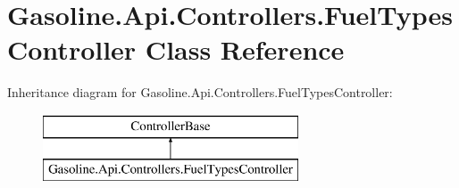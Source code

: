 \hypertarget{class_gasoline_1_1_api_1_1_controllers_1_1_fuel_types_controller}{}\section{Gasoline.\+Api.\+Controllers.\+Fuel\+Types\+Controller Class Reference}
\label{class_gasoline_1_1_api_1_1_controllers_1_1_fuel_types_controller}
Inheritance diagram for Gasoline.\+Api.\+Controllers.\+Fuel\+Types\+Controller\+:\begin{figure}[H]
\begin{center}
\leavevmode
\includegraphics[height=2.000000cm]{class_gasoline_1_1_api_1_1_controllers_1_1_fuel_types_controller}
\end{center}
\end{figure}
